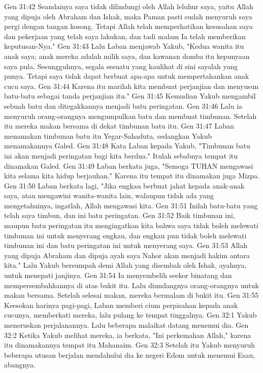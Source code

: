 Gen 31:42  Seandainya saya tidak dilindungi oleh Allah leluhur saya, yaitu Allah yang dipuja oleh Abraham dan Ishak, maka Paman pasti sudah menyuruh saya pergi dengan tangan kosong. Tetapi Allah telah memperhatikan kesusahan saya dan pekerjaan yang telah saya lakukan, dan tadi malam Ia telah memberikan keputusan-Nya."
Gen 31:43  Lalu Laban menjawab Yakub, "Kedua wanita itu anak saya; anak mereka adalah milik saya, dan kawanan domba itu kepunyaan saya pula. Sesungguhnya, segala sesuatu yang kaulihat di sini sayalah yang punya. Tetapi saya tidak dapat berbuat apa-apa untuk mempertahankan anak cucu saya.
Gen 31:44  Karena itu marilah kita membuat perjanjian dan menyusun batu-batu sebagai tanda perjanjian itu."
Gen 31:45  Kemudian Yakub mengambil sebuah batu dan ditegakkannya menjadi batu peringatan.
Gen 31:46  Lalu ia menyuruh orang-orangnya mengumpulkan batu dan membuat timbunan. Setelah itu mereka makan bersama di dekat timbunan batu itu.
Gen 31:47  Laban menamakan timbunan batu itu Yegar-Sahaduta, sedangkan Yakub menamakannya Galed.
Gen 31:48  Kata Laban kepada Yakub, "Timbunan batu ini akan menjadi peringatan bagi kita berdua." Itulah sebabnya tempat itu dinamakan Galed.
Gen 31:49  Laban berkata juga, "Semoga TUHAN mengawasi kita selama kita hidup berjauhan." Karena itu tempat itu dinamakan juga Mizpa.
Gen 31:50  Laban berkata lagi, "Jika engkau berbuat jahat kepada anak-anak saya, atau mengawini wanita-wanita lain, walaupun tidak ada yang mengetahuinya, ingatlah, Allah mengawasi kita.
Gen 31:51  Inilah batu-batu yang telah saya timbun, dan ini batu peringatan.
Gen 31:52  Baik timbunan ini, maupun batu peringatan itu mengingatkan kita bahwa saya tidak boleh melewati timbunan ini untuk menyerang engkau, dan engkau pun tidak boleh melewati timbunan ini dan batu peringatan ini untuk menyerang saya.
Gen 31:53  Allah yang dipuja Abraham dan dipuja ayah saya Nahor akan menjadi hakim antara kita." Lalu Yakub bersumpah demi Allah yang disembah oleh Ishak, ayahnya, untuk menepati janjinya.
Gen 31:54  Ia menyembelih seekor binatang dan mempersembahkannya di atas bukit itu. Lalu diundangnya orang-orangnya untuk makan bersama. Setelah selesai makan, mereka bermalam di bukit itu.
Gen 31:55  Keesokan harinya pagi-pagi, Laban memberi cium perpisahan kepada anak cucunya, memberkati mereka, lalu pulang ke tempat tinggalnya.
Gen 32:1  Yakub meneruskan perjalanannya. Lalu beberapa malaikat datang menemui dia.
Gen 32:2  Ketika Yakub melihat mereka, ia berkata, "Ini perkemahan Allah," karena itu dinamakannya tempat itu Mahanaim.
Gen 32:3  Setelah itu Yakub menyuruh beberapa utusan berjalan mendahului dia ke negeri Edom untuk menemui Esau, abangnya.
